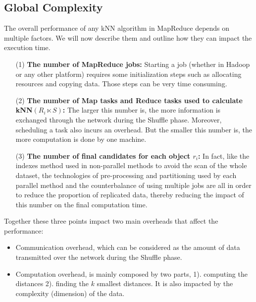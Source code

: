 
\subsection{Global Complexity}
\label{section:global_complexity}
The overall performance of any kNN algorithm in MapReduce depends on multiple factors. We will now describe them 
and outline how they can impact the execution time.  
\begin{itemize}

\item[(1)] \textbf{The number of MapReduce jobs:} Starting a job (whether in 
Hadoop\cite{Jiang:2010:PMI:1920841.1920903} or any other platform) requires some initialization steps 
such as allocating resources and copying data. Those steps can be very time 
consuming.

\item[(2)] \textbf{The number of Map tasks and Reduce tasks used to calculate kNN$\left(R_i \ltimes S\right)$:} The larger this number is, the more 
information is exchanged through the network during the Shuffle phase. 
Moreover, scheduling a task also incurs an overhead. But the smaller this number is, the more computation is done by one machine.

\item[(3)] \textbf{The number of final candidates for each object $r_i$:} %
In fact, like the indexes method used in non-parallel methods to avoid the scan of the whole dataset,  the technologies of pre-processing and partitioning used by each parallel method and the counterbalance of using multiple jobs are all in order to reduce the proportion of replicated data, thereby reducing the impact of this number on the final computation time. 



\end{itemize} 


Together these three points impact two main overheads that affect the performance:
\begin{itemize}
\item Communication overhead, which can be considered as the amount of data transmitted over the network during the 
Shuffle phase. %

\item Computation overhead, %
is mainly composed by two parts, 1). computing the distances 2). finding the $k$ smallest distances. It is also 
impacted by the  complexity (dimension) of the data.
\end{itemize}

